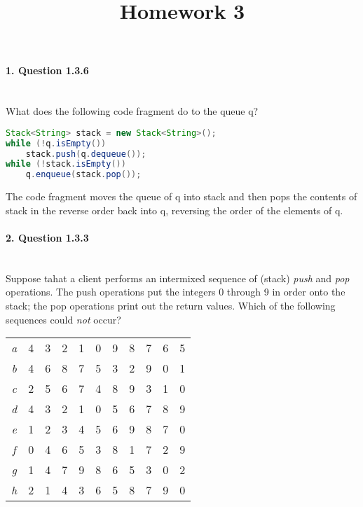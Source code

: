 \documentclass{article}
\begin{document}
\title{Homework 3}
\date{}
\maketitle

\paragraph{\Large 1. Question 1.3.6}\mbox{}\\
What does the following code fragment do to the queue q?
\begin{lstlisting}[language=Java]
Stack<String> stack = new Stack<String>();
while (!q.isEmpty())
    stack.push(q.dequeue());
while (!stack.isEmpty())
    q.enqueue(stack.pop());
\end{lstlisting}

The code fragment moves the queue of q into stack and then pops the contents of stack in the reverse order back into q, reversing the order of the elements of q.

\paragraph{\Large 2. Question 1.3.3}\mbox{}\\
Suppose tahat a client performs an intermixed sequence of (stack) \textit{push} and \textit{pop} operations. The push operations put the integers 0 through 9 in order onto the stack; the pop operations print out the return values. Which of the following sequences could \textit{not} occur?\\

\begin{tabular}{c c c c c c c c c c c}
\textit{a} & 4 & 3 & 2 & 1 & 0 & 9 & 8 & 7 & 6 & 5\\
\textit{b} & 4 & 6 & 8 & 7 & 5 & 3 & 2 & 9 & 0 & 1\\
\textit{c} & 2 & 5 & 6 & 7 & 4 & 8 & 9 & 3 & 1 & 0\\
\textit{d} & 4 & 3 & 2 & 1 & 0 & 5 & 6 & 7 & 8 & 9\\
\textit{e} & 1 & 2 & 3 & 4 & 5 & 6 & 9 & 8 & 7 & 0\\
\textit{f} & 0 & 4 & 6 & 5 & 3 & 8 & 1 & 7 & 2 & 9\\
\textit{g} & 1 & 4 & 7 & 9 & 8 & 6 & 5 & 3 & 0 & 2\\
\textit{h} & 2 & 1 & 4 & 3 & 6 & 5 & 8 & 7 & 9 & 0
\end{tabular}\\\\
\end{document}
